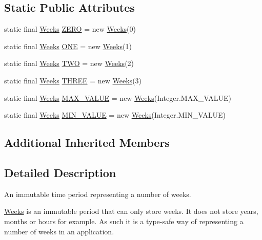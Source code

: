 \subsection*{Static Public Attributes}
\begin{DoxyCompactItemize}
\item 
static final \hyperlink{classorg_1_1joda_1_1time_1_1_weeks}{Weeks} \hyperlink{classorg_1_1joda_1_1time_1_1_weeks_ac751553008e97d1c09f1ed38761f4f7a}{Z\-E\-R\-O} = new \hyperlink{classorg_1_1joda_1_1time_1_1_weeks}{Weeks}(0)
\item 
static final \hyperlink{classorg_1_1joda_1_1time_1_1_weeks}{Weeks} \hyperlink{classorg_1_1joda_1_1time_1_1_weeks_a716e1ca9d658b42d1a9befe7254620ef}{O\-N\-E} = new \hyperlink{classorg_1_1joda_1_1time_1_1_weeks}{Weeks}(1)
\item 
static final \hyperlink{classorg_1_1joda_1_1time_1_1_weeks}{Weeks} \hyperlink{classorg_1_1joda_1_1time_1_1_weeks_aec79d3a7021c4178a6ef3d985436583f}{T\-W\-O} = new \hyperlink{classorg_1_1joda_1_1time_1_1_weeks}{Weeks}(2)
\item 
static final \hyperlink{classorg_1_1joda_1_1time_1_1_weeks}{Weeks} \hyperlink{classorg_1_1joda_1_1time_1_1_weeks_ac63306114df0265a792383927982f4a6}{T\-H\-R\-E\-E} = new \hyperlink{classorg_1_1joda_1_1time_1_1_weeks}{Weeks}(3)
\item 
static final \hyperlink{classorg_1_1joda_1_1time_1_1_weeks}{Weeks} \hyperlink{classorg_1_1joda_1_1time_1_1_weeks_abfd3e1a51c4c3070f3c9d596e3442338}{M\-A\-X\-\_\-\-V\-A\-L\-U\-E} = new \hyperlink{classorg_1_1joda_1_1time_1_1_weeks}{Weeks}(Integer.\-M\-A\-X\-\_\-\-V\-A\-L\-U\-E)
\item 
static final \hyperlink{classorg_1_1joda_1_1time_1_1_weeks}{Weeks} \hyperlink{classorg_1_1joda_1_1time_1_1_weeks_aac9dbd14f0109400dc93040e895f6b16}{M\-I\-N\-\_\-\-V\-A\-L\-U\-E} = new \hyperlink{classorg_1_1joda_1_1time_1_1_weeks}{Weeks}(Integer.\-M\-I\-N\-\_\-\-V\-A\-L\-U\-E)
\end{DoxyCompactItemize}
\subsection*{Additional Inherited Members}


\subsection{Detailed Description}
An immutable time period representing a number of weeks. 

{\ttfamily \hyperlink{classorg_1_1joda_1_1time_1_1_weeks}{Weeks}} is an immutable period that can only store weeks. It does not store years, months or hours for example. As such it is a type-\/safe way of representing a number of weeks in an application. 

